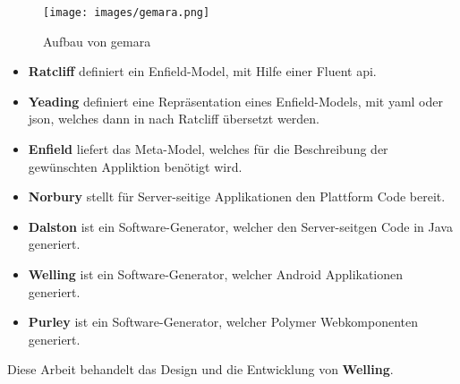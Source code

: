 \begin{figure}[H]
	\begin{center}
		\texttt{[image: images/gemara.png]}
		\caption{Aufbau von \acs{gemara}}
		\label{fig:gemara}
	\end{center}
\end{figure}

\begin{itemize}
	\item \textbf{Ratcliff} definiert ein Enfield-Model, mit Hilfe einer Fluent \acs{api}.
	\item \textbf{Yeading} definiert eine Repräsentation eines Enfield-Models, mit \acf{yaml} oder \acf{json}, welches dann in nach Ratcliff übersetzt werden.
	\item \textbf{Enfield} liefert das Meta-Model, welches für die Beschreibung der gewünschten Appliktion benötigt wird.
	\item \textbf{Norbury} stellt für Server-seitige Applikationen den Plattform Code bereit.
	\item \textbf{Dalston} ist ein Software-Generator, welcher den Server-seitgen Code in Java generiert.
	\item \textbf{Welling} ist ein Software-Generator, welcher Android Applikationen generiert.
	\item \textbf{Purley} ist ein Software-Generator, welcher Polymer Webkomponenten generiert. 
\end{itemize}

Diese Arbeit behandelt das Design und die Entwicklung von \textbf{Welling}.


